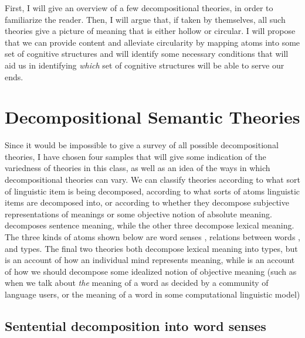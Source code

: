 \documentclass[12pt]{amsart}
\begin{document}
First, I will give an overview of a few decompositional theories, in order to familiarize the reader. Then, I will argue that, if taken by themselves, all such theories give a picture of meaning that is either hollow or circular. I will propose that we can provide content and alleviate circularity by mapping atoms into some set of cognitive structures and will identify some necessary conditions that will aid us in identifying \emph{which} set of cognitive structures will be able to serve our ends.

\section{Decompositional Semantic Theories}

Since it would be impossible to give a survey of all possible decompositional theories, I have chosen four samples that will give some indication of the variedness of theories in this class, as well as an idea of the ways in which decompositional theories can vary. We can classify theories according to what sort of linguistic item is being decomposed, according to what sorts of atoms linguistic items are decomposed into, or according to whether they decompose subjective representations of meanings or some objective notion of absolute meaning. \cite{fodor_structure_1963} decomposes sentence meaning, while the other three decompose lexical meaning. The three kinds of atoms shown below are word senses \cite{fodor_structure_1963}, relations between words \cite{cruse_lexical_1986}, and types. The final two theories both decompose lexical meaning into types, but \cite{jackendoff_semantics_1983} is an account of how an individual mind represents meaning, while \cite{pustejovsky_generative_1998} is an account of how we should decompose some idealized notion of objective meaning (such as when we talk about \emph{the} meaning of a word as decided by a community of language users, or the meaning of a word in some computational linguistic model)

\subsection{Sentential decomposition into word senses}
\end{document}
